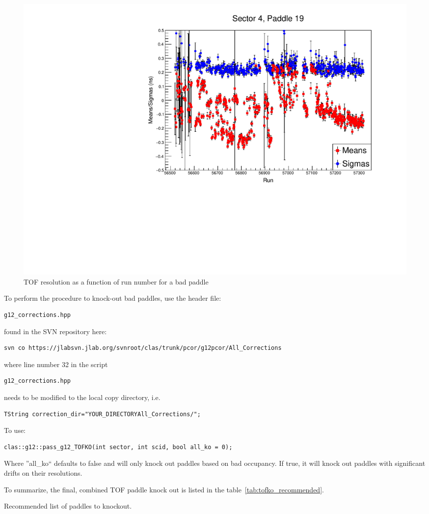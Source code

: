 \begin{v2}
\begin{figure}\begin{center}
      \includegraphics[width=0.4\columnwidth,angle=270]{figures/calib/tof/badexample.pdf}
   \caption{\label{plot:example.badpaddle}TOF resolution as a function of run number for a bad paddle}
\end{center}\end{figure}

To perform the procedure to knock-out bad  paddles, use the header file:
\begin{verbatim}
g12_corrections.hpp
\end{verbatim}
found in the SVN repository here:
\begin{verbatim}
svn co https://jlabsvn.jlab.org/svnroot/clas/trunk/pcor/g12pcor/All_Corrections
\end{verbatim}
where line number 32 in the script 
\begin{verbatim}
g12_corrections.hpp
\end{verbatim}
needs to be modified to the local copy directory, i.e.
\begin{verbatim}
TString correction_dir="YOUR_DIRECTORYAll_Corrections/";
\end{verbatim}
To use:
\begin{verbatim}
clas::g12::pass_g12_TOFKO(int sector, int scid, bool all_ko = 0);
\end{verbatim}
Where ''all\_ko`` defaults to false and will only knock out paddles based on bad occupancy. If true, it will knock out paddles with significant drifts on their resolutions.



To summarize, the final, combined TOF paddle knock out is listed in the table~\ref{tab:tofko_recommended}.

\begin{table}
\begin{center}
\begin{singlespacing}
\caption[Recommended list of paddles to knockout.]{\label{tab:tofko_recommended}Recommended list of paddles to knockout.}


\end{singlespacing}
\end{center}
\end{table}
\end{v2}
